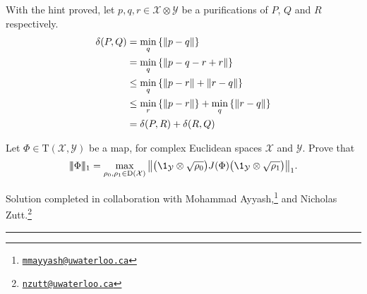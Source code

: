 \documentclass[boxes,pages,color=SeaGreen]{homework}
\newcommand{\collab}[1]{\footnote{\href{mailto:#1}{\texttt{#1}}}}
\newcommand{\X}{\mathcal{X}}
\newcommand{\Y}{\mathcal{Y}}
\newcommand{\Trans}{\mathrm{T}}
\newcommand{\Density}{\mathrm{D}}
\newcommand{\triplenorm}[1]{
  \lvert\!\lvert\!\lvert #1
  \rvert\!\rvert\!\rvert}
\begin{document}
\begin{solution}
    With the hint proved, let $p, q, r\in\X\otimes\Y$ be a purifications of $P$, $Q$ and $R$ respectively.
    \begin{align*}
        \delta(P, Q) & = \min_{q}\qty{\norm{p - q}}                                 \\
                     & = \min_{q}\qty{\norm{p - q - r + r}}                         \\
                     & \leq \min_{q}\qty{\norm{p - r} + \norm{r - q}}               \\
                     & \leq \min_{r}\qty{\norm{p - r}} + \min_{q}\qty{\norm{r - q}} \\
                     & = \delta(P, R) + \delta(R, Q)
    \end{align*}

\end{solution}


\begin{problem}
Let $\Phi\in\Trans(\X,\Y)$ be a map, for complex Euclidean spaces $\X$ and
$\Y$.
Prove that
\[
    \triplenorm{\Phi}_1 =
    \max_{\rho_0,\rho_1\in\Density(\X)}
    \norm{
        \qty\big( \1_{\Y} \otimes \sqrt{\rho_0} ) J(\Phi)
        \qty\big( \1_{\Y} \otimes \sqrt{\rho_1} )
    }_1.
\]
\end{problem}

\noindent Solution completed in collaboration with Mohammad Ayyash,\collab{mmayyash@uwaterloo.ca} and Nicholas Zutt.\collab{nzutt@uwaterloo.ca}

{\noindent\color{SeaGreen!30}\rule{\textwidth}{1.5pt}}
\end{document}
